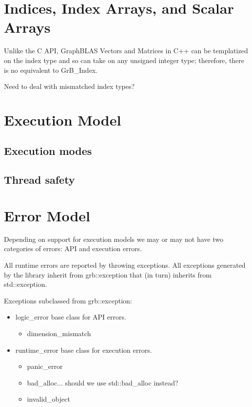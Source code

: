 \section{Indices, Index Arrays, and Scalar Arrays}

Unlike the C API, GraphBLAS Vectors and Matrices in C++ can be templatized on
the index type and so can take on any unsigned integer type; therefore, there is
no equivalent to GrB\_Index.

Need to deal with mismatched index types?

\section{Execution Model}

\subsection{Execution modes}

\subsection{Thread safety}
\label{Sec:ThreadSafety}


\section{Error Model}
\label{Sec:ErrorModel}

Depending on support for execution models we may or may not have two 
categories of errors: API and execution errors.

All runtime errors are reported by throwing exceptions.  All exceptions generated
by the library inherit from {\sf grb::exception} that (in turn) inherits 
from {\sf std::exception}.

Exceptions subclassed from {\sf grb::exception}:

\begin{itemize}
\item {\sf logic\_error} base class for API errors.
    \begin{itemize}
    \item {\sf dimension\_mismatch}
    \end{itemize}
\item {\sf runtime\_error} base class for execution errors.
    \begin{itemize}
    \item {\sf panic\_error}
    \item {\sf bad\_alloc}... should we use {\sf std::bad\_alloc} instead?
    \item {\sf invalid\_object}
    \end{itemize}
\end{itemize}

